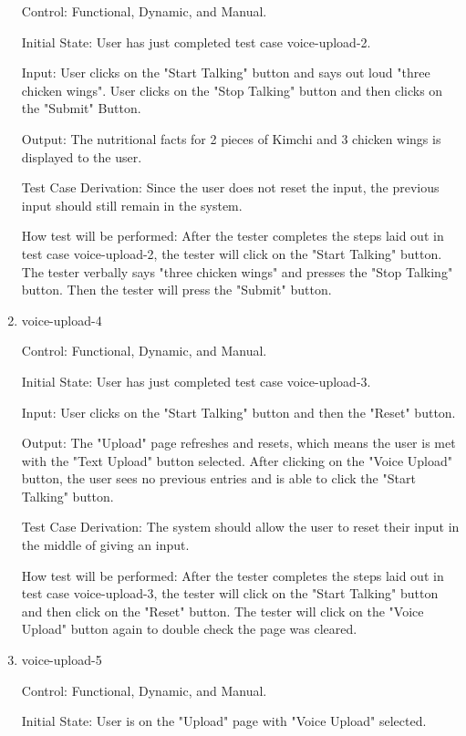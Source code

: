 \documentclass[12pt, titlepage]{article}
\begin{document}
\begin{enumerate}
	Control: Functional, Dynamic, and Manual.
	
	Initial State: User has just completed test case voice-upload-2.
	
	Input: User clicks on the "Start Talking" button and says out loud "three chicken wings". User clicks on the "Stop Talking" button and then clicks on the "Submit" Button.
	
	Output: The nutritional facts for 2 pieces of Kimchi and 3 chicken wings is displayed to the user.
	
	Test Case Derivation: Since the user does not reset the input, the previous input should still remain in the system.
	
	How test will be performed: After the tester completes the steps laid out in test case voice-upload-2, the tester will click on the "Start Talking" button. The tester verbally says "three chicken wings" and presses the "Stop Talking" button. Then the tester will press the "Submit" button.
	
	\item{voice-upload-4\\}
	
	Control: Functional, Dynamic, and Manual.
	
	Initial State: User has just completed test case voice-upload-3.
	
	Input: User clicks on the "Start Talking" button and then the "Reset" button.
	
	Output: The "Upload" page refreshes and resets, which means the user is met with the "Text Upload" button selected. After clicking on the "Voice Upload" button, the user sees no previous entries and is able to click the "Start Talking" button.
	
	Test Case Derivation: The system should allow the user to reset their input in the middle of giving an input.
	
	How test will be performed: After the tester completes the steps laid out in test case voice-upload-3, the tester will click on the "Start Talking" button and then click on the "Reset" button. The tester will click on the "Voice Upload" button again to double check the page was cleared.
	
	\item{voice-upload-5\\}
	
	Control: Functional, Dynamic, and Manual.
	
	Initial State: User is on the "Upload" page with "Voice Upload" selected.
	

\end{enumerate}
\end{document}
